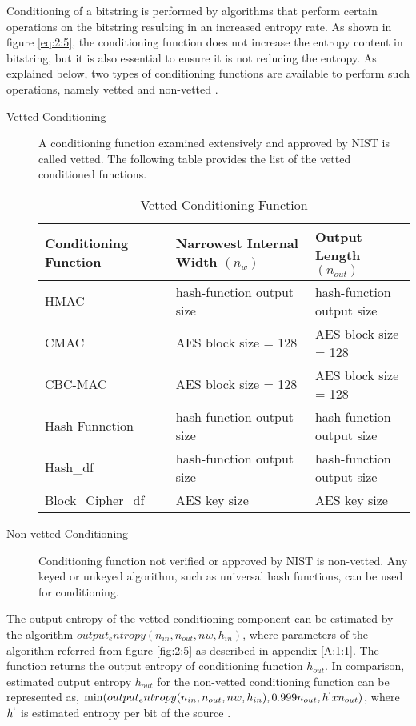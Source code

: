 Conditioning of a bitstring is performed by algorithms that perform certain operations on the bitstring resulting in an increased entropy rate. As shown in figure \ref{eq:2:5}, the conditioning function does not increase the entropy content in bitstring, but it is also essential to ensure it is not reducing the entropy. As explained below, two types of conditioning functions are available to perform such operations, namely vetted and non-vetted \cite{SP90B-2018}.

\begin{description}
	\item[Vetted Conditioning] A conditioning function examined extensively and approved by NIST is called vetted. The following table provides the list of the vetted conditioned functions.
	\begin{table}[htbp]
		\centering
		\begin{tabular}{||m{3.5cm} m{4cm} m{4cm}||}
			 \hline
			Conditioning Function & Narrowest Internal Width $(n_{w})$ & Output Length $(n_{out})$
			 \\ [0.5ex] 
			\hline\hline
			HMAC & hash-function output size & hash-function output size \\
			CMAC & AES block size = 128 & AES block size = 128 \\
			CBC-MAC & AES block size = 128 & AES block size = 128 \\
			Hash Funnction & hash-function output size & hash-function output size \\
			Hash\_df & hash-function output size & hash-function output size \\
			Block\_Cipher\_df & AES key size & AES key size \\
			\hline
		\end{tabular}
		\caption{Vetted Conditioning Function \cite{SP90B-2018}}
		\label{table:2:1}
	\end{table}
	\item[Non-vetted Conditioning] Conditioning function not verified or approved by NIST is non-vetted. Any keyed or unkeyed algorithm, such as universal hash functions, can be used for conditioning.
\end{description}

The output entropy of the vetted conditioning component can be estimated by the algorithm $output_entropy(n_{in}, n_{out}, nw, h_{in})$, where parameters of the algorithm referred from figure \ref{fig:2:5} as described in appendix \ref{A:1:1}. The function returns the output entropy of conditioning function $h_{out}$. In comparison, estimated output entropy $h_{out}$ for the non-vetted conditioning function can be represented as, $\min(output_entropy(n_{in}, n_{out}, nw, h_{in}), 0.999n_{out}, h^{`}xn_{out})$, where $h^{`}$ is estimated entropy per bit of the source \cite{SP90B-2018}. 

